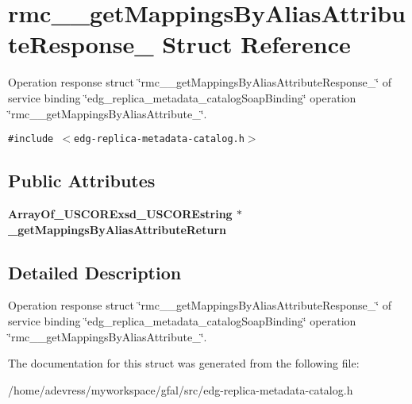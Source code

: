 \section{rmc\_\-\_\-get\-Mappings\-By\-Alias\-Attribute\-Response\_\- Struct Reference}
\label{structrmc____getMappingsByAliasAttributeResponse__}
Operation response struct \char`\"{}rmc\_\-\_\-get\-Mappings\-By\-Alias\-Attribute\-Response\_\-\char`\"{} of service binding \char`\"{}edg\_\-replica\_\-metadata\_\-catalog\-Soap\-Binding\char`\"{} operation \char`\"{}rmc\_\-\_\-get\-Mappings\-By\-Alias\-Attribute\_\-\char`\"{}.  


{\tt \#include $<$edg-replica-metadata-catalog.h$>$}

\subsection*{Public Attributes}
\begin{CompactItemize}
\item 
\bf{Array\-Of\_\-USCORExsd\_\-USCOREstring} $\ast$ \textbf{\_\-get\-Mappings\-By\-Alias\-Attribute\-Return}\label{structrmc____getMappingsByAliasAttributeResponse___477819836199cc0fc12ca1f971351618}

\end{CompactItemize}


\subsection{Detailed Description}
Operation response struct \char`\"{}rmc\_\-\_\-get\-Mappings\-By\-Alias\-Attribute\-Response\_\-\char`\"{} of service binding \char`\"{}edg\_\-replica\_\-metadata\_\-catalog\-Soap\-Binding\char`\"{} operation \char`\"{}rmc\_\-\_\-get\-Mappings\-By\-Alias\-Attribute\_\-\char`\"{}. 



The documentation for this struct was generated from the following file:\begin{CompactItemize}
\item 
/home/adevress/myworkspace/gfal/src/edg-replica-metadata-catalog.h\end{CompactItemize}
